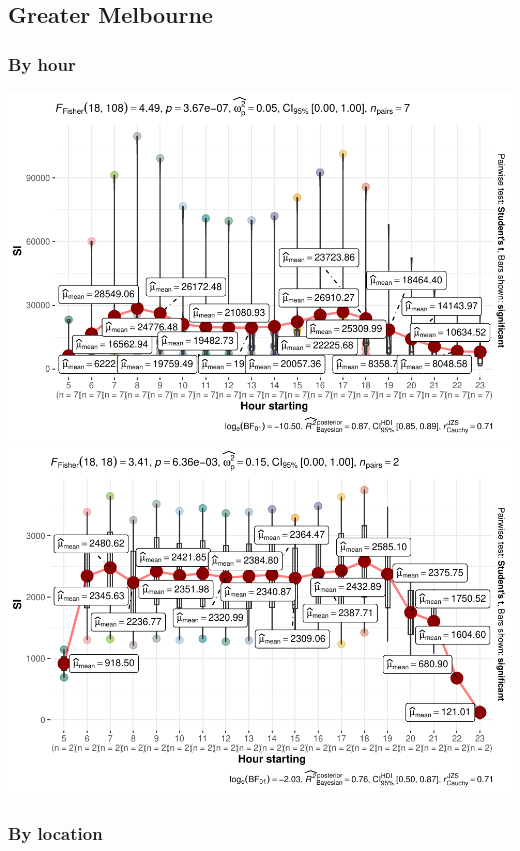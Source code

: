 \documentclass[preprint, 3p,
authoryear]{elsarticle} %
\begin{document}
\hypertarget{greater-melbourne}{%
\subsection{Greater Melbourne}\label{greater-melbourne}}

\hypertarget{by-hour}{%
\subsubsection{By hour}\label{by-hour}}

\includegraphics{Leveraging_GTFS_to_assess_transit_supply_Transport_Geography_files/figure-latex/Melbourne_230808_by_hour-1.pdf}
\includegraphics{Leveraging_GTFS_to_assess_transit_supply_Transport_Geography_files/figure-latex/Mornington_230808_by_hour-1.pdf}

\hypertarget{by-location}{%
\subsubsection{By location}\label{by-location}}
\end{document}
